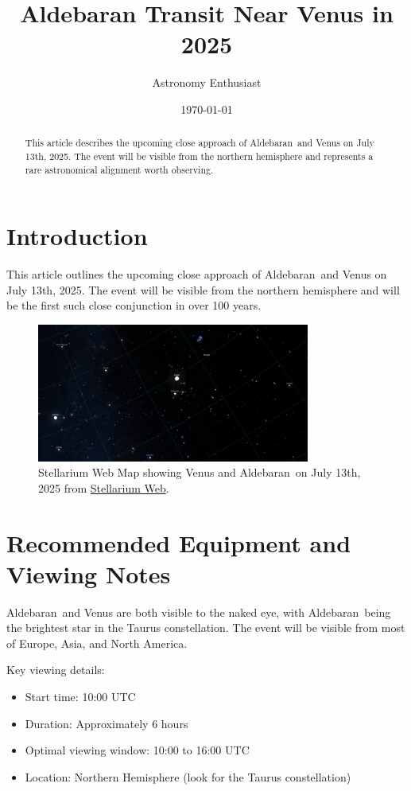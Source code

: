 \documentclass[12pt,oneside,a4paper,english]{article}
\title{\textbf{Aldebaran Transit Near Venus in 2025}}
\author{Astronomy Enthusiast}
\date{\today}
\newcommand{\Aldebaran}{Aldebaran}
\begin{document}
\maketitle

\begin{abstract}
This article describes the upcoming close approach of \Aldebaran\ and Venus on July 13th, 2025. The event will be visible from the northern hemisphere and represents a rare astronomical alignment worth observing.
\end{abstract}

\section{Introduction}
This article outlines the upcoming close approach of \Aldebaran\ and Venus on July 13th, 2025. The event will be visible from the northern hemisphere and will be the first such close conjunction in over 100 years. 

\begin{figure}[H]
\centering
\includegraphics[width=0.8\textwidth]{VenusTransit.png}
\caption{Stellarium Web Map showing Venus and \Aldebaran\ on July 13th, 2025 from \href{https://stellarium-web.org/}{Stellarium Web}.}
\label{fig:venus_transit}
\end{figure}

\section{Recommended Equipment and Viewing Notes}
\Aldebaran\ and Venus are both visible to the naked eye, with \Aldebaran\ being the brightest star in the Taurus constellation. The event will be visible from most of Europe, Asia, and North America. 

Key viewing details:
\begin{itemize}
\item Start time: 10:00 UTC
\item Duration: Approximately 6 hours
\item Optimal viewing window: 10:00 to 16:00 UTC
\item Location: Northern Hemisphere (look for the Taurus constellation)
\end{itemize}
\end{document}
